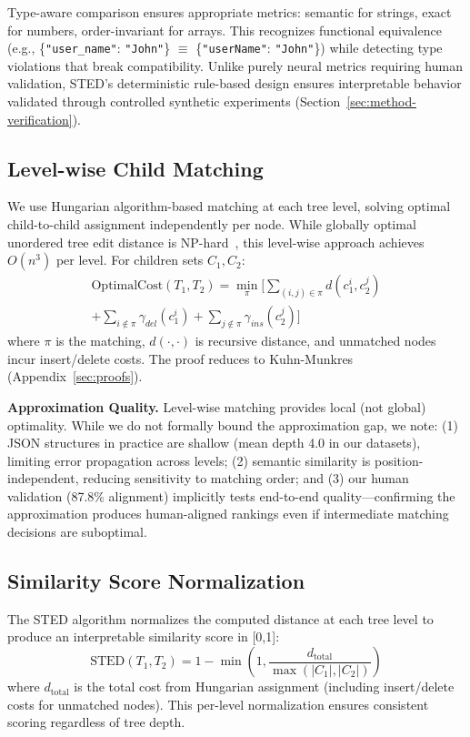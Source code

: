 \documentclass{article}
\theoremstyle{plain}
\theoremstyle{definition}
\begin{document}
Type-aware comparison ensures appropriate metrics: semantic for strings, exact for numbers, order-invariant for arrays. This recognizes functional equivalence (e.g., \{\texttt{"user\_name"}: \texttt{"John"}\} $\equiv$ \{\texttt{"userName"}: \texttt{"John"}\}) while detecting type violations that break compatibility. Unlike purely neural metrics requiring human validation, STED's deterministic rule-based design ensures interpretable behavior validated through controlled synthetic experiments (Section~\ref{sec:method-verification}).

\subsection{Level-wise Child Matching}

We use Hungarian algorithm-based matching at each tree level, solving optimal child-to-child assignment independently per node. While globally optimal unordered tree edit distance is NP-hard~\cite{Zhang1992}, this level-wise approach achieves $O(n^3)$ per level. For children sets $C_1, C_2$:
\begin{multline}
\text{OptimalCost}(T_1, T_2) = \min_{\pi} \Big[ \sum_{(i,j) \in \pi} d(c_1^i, c_2^j) \\
+ \sum_{i \notin \pi} \gamma_{del}(c_1^i) + \sum_{j \notin \pi} \gamma_{ins}(c_2^j) \Big]
\end{multline}
where $\pi$ is the matching, $d(\cdot, \cdot)$ is recursive distance, and unmatched nodes incur insert/delete costs. The proof reduces to Kuhn-Munkres (Appendix~\ref{sec:proofs}).

\textbf{Approximation Quality.} Level-wise matching provides local (not global) optimality. While we do not formally bound the approximation gap, we note: (1) JSON structures in practice are shallow (mean depth 4.0 in our datasets), limiting error propagation across levels; (2) semantic similarity is position-independent, reducing sensitivity to matching order; and (3) our human validation (87.8\% alignment) implicitly tests end-to-end quality---confirming the approximation produces human-aligned rankings even if intermediate matching decisions are suboptimal.

\subsection{Similarity Score Normalization}

The STED algorithm normalizes the computed distance at each tree level to produce an interpretable similarity score in [0,1]:
\begin{equation}
\text{STED}(T_1, T_2) = 1 - \min\left(1, \frac{d_{\text{total}}}{\max(|C_1|, |C_2|)}\right)
\end{equation}
where $d_{\text{total}}$ is the total cost from Hungarian assignment (including insert/delete costs for unmatched nodes). This per-level normalization ensures consistent scoring regardless of tree depth.
\end{document}
